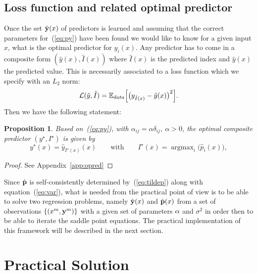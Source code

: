 \documentclass[envcountsect,runningheads]{llncs}
\theoremstyle{etoile}
\newtheorem{prop}{Proposition}[section]
\DeclareMathOperator*{\argmax}{argmax}
\begin{document}
\subsection{Loss function and related optimal predictor}
Once the set $\hat {\bf y}(x)$ of predictors is learned and assuming that the correct parameters for~(\ref{eq:py}) have been found
we would like to know for a given input $x$, what is the optimal predictor for $y_i(x)$. Any predictor has  to come in a composite form
$(\hat y(x),\hat I(x))$ where $\hat I(x)$ is the predicted index and $\hat y(x)$ the predicted value.
This is necessarily associated to a loss function 
which we specify with an $L_2$ norm:
\begin{equation}\label{eq:orloss}
{\cal L}(\hat y,\hat I) = {\mathbb E}_{data}\Bigl[\bigl(y_{\hat I(x)}-\hat y(x)\bigr)^2\Bigr]. 
\end{equation}
Then we have the following statement:
\begin{prop}\label{prop:opred}
Based on~(\ref{eq:py}), with $\alpha_{ij} = \alpha\delta_{ij},\ \alpha>0$, the optimal composite predictor $(y^\star,I^\star)$ is given by
\[
y^\star(x) = \hat y_{I^\star(x)}(x)\qquad\text{with}\qquad I^\star(x) = \argmax_{i} \bigl(\hat p_i(x)\bigr), 
\]
\end{prop}
\begin{proof}
See Appendix~\ref{app:opred}
\end{proof}

Since $\hat {\bf p}$ is self-consistently determined by~(\ref{eq:tildep}) along with equation~(\ref{eq:var}), what is needed from the practical point of view is to be able
to solve two  regression problems, namely $\hat {\bf y}(x)$ and $\hat {\bf p}(x)$ from a set of observations $\{(x^{m},{\bf y}^{m})\}$ with a given set of parameters ${\bf \alpha}$
and $\sigma^2$ in order then to be able to iterate the saddle point equations. The practical implementation of this framework will be described in the next section.


\section{Practical Solution}\label{sec:model}
\end{document}

